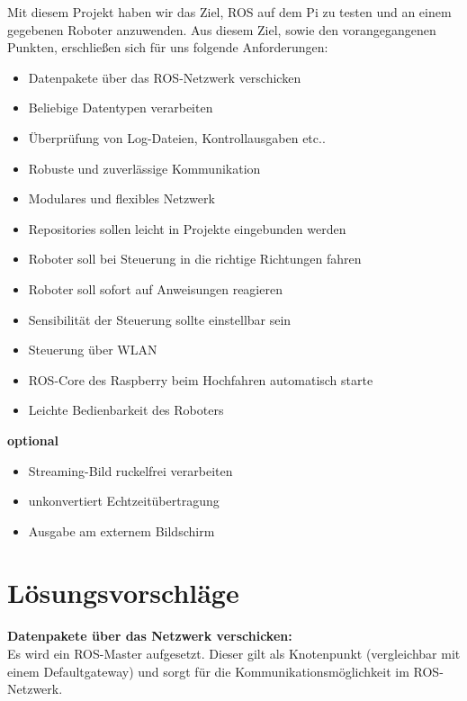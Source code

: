\documentclass[12pt]{article}
\begin{document}
Mit diesem Projekt haben wir das Ziel, ROS auf dem Pi zu testen und an einem gegebenen Roboter anzuwenden. Aus diesem Ziel, sowie den vorangegangenen Punkten, erschließen sich für uns folgende Anforderungen:
\vspace{0,4cm}
\begin{itemize}
\item Datenpakete über das ROS-Netzwerk verschicken
\item Beliebige Datentypen verarbeiten
\item Überprüfung von Log-Dateien, Kontrollausgaben etc..
\item Robuste und zuverlässige Kommunikation
\item Modulares und flexibles Netzwerk
\item Repositories sollen leicht in Projekte eingebunden werden

\vspace{0,6cm}

\item Roboter soll bei Steuerung in die richtige Richtungen fahren
\item Roboter soll sofort auf Anweisungen reagieren
\item Sensibilität der Steuerung sollte einstellbar sein
\item Steuerung über WLAN
\item ROS-Core des Raspberry beim Hochfahren automatisch starte
\item Leichte Bedienbarkeit des Roboters

\vspace{0,6cm}

\end{itemize}

{\bf optional}

\begin{itemize}
\item Streaming-Bild ruckelfrei verarbeiten
\item unkonvertiert Echtzeitübertragung
\item Ausgabe am externem Bildschirm
\end{itemize}


\section{Lösungsvorschläge}

{\bf Datenpakete über das Netzwerk verschicken:}\\
Es wird ein ROS-Master aufgesetzt. Dieser gilt als Knotenpunkt (vergleichbar mit einem Defaultgateway) und sorgt für die Kommunikationsmöglichkeit im ROS-Netzwerk.
\end{document}
